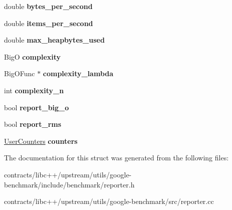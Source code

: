 \begin{DoxyCompactItemize}
double {\bfseries bytes\+\_\+per\+\_\+second}
\item 
\mbox{\label{structbenchmark_1_1_benchmark_reporter_1_1_run_adecfd472f20b97a663514749993a7c46}} 
double {\bfseries items\+\_\+per\+\_\+second}
\item 
\mbox{\label{structbenchmark_1_1_benchmark_reporter_1_1_run_a8780b58b2b560abb6181190c66f3db43}} 
double {\bfseries max\+\_\+heapbytes\+\_\+used}
\item 
\mbox{\label{structbenchmark_1_1_benchmark_reporter_1_1_run_a1d7a2c745a69f751d57e159d260ea2f5}} 
BigO {\bfseries complexity}
\item 
\mbox{\label{structbenchmark_1_1_benchmark_reporter_1_1_run_a178db4272812ca32c49136b7a3eaf708}} 
Big\+O\+Func $\ast$ {\bfseries complexity\+\_\+lambda}
\item 
\mbox{\label{structbenchmark_1_1_benchmark_reporter_1_1_run_a71ebacce0be5ab077f457f54c990c66c}} 
int {\bfseries complexity\+\_\+n}
\item 
\mbox{\label{structbenchmark_1_1_benchmark_reporter_1_1_run_a074e85e93ba222cfa7aa3a2a04453f6d}} 
bool {\bfseries report\+\_\+big\+\_\+o}
\item 
\mbox{\label{structbenchmark_1_1_benchmark_reporter_1_1_run_a63312dd9b92f8205abd9b2e2ba924570}} 
bool {\bfseries report\+\_\+rms}
\item 
\mbox{\label{structbenchmark_1_1_benchmark_reporter_1_1_run_ab8422b3d4573c022e883a92f4d120599}} 
\mbox{\hyperlink{classstd_1_1map}{User\+Counters}} {\bfseries counters}
\end{DoxyCompactItemize}


The documentation for this struct was generated from the following files\+:\begin{DoxyCompactItemize}
\item 
contracts/libc++/upstream/utils/google-\/benchmark/include/benchmark/reporter.\+h\item 
contracts/libc++/upstream/utils/google-\/benchmark/src/reporter.\+cc\end{DoxyCompactItemize}

